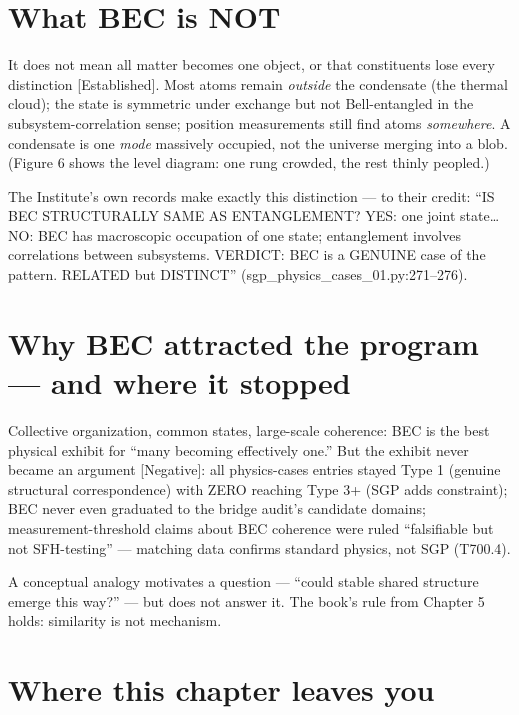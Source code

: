 \documentclass[
  11pt,
]{book}
\begin{document}
\section{What BEC is NOT}\label{what-bec-is-not}

It does not mean all matter becomes one object, or that constituents
lose every distinction {[}Established{]}. Most atoms remain
\emph{outside} the condensate (the thermal cloud); the state is
symmetric under exchange but not Bell-entangled in the
subsystem-correlation sense; position measurements still find atoms
\emph{somewhere}. A condensate is one \emph{mode} massively occupied,
not the universe merging into a blob. (Figure 6 shows the level diagram:
one rung crowded, the rest thinly peopled.)

The Institute's own records make exactly this distinction --- to their
credit: ``IS BEC STRUCTURALLY SAME AS ENTANGLEMENT? YES: one joint
state\ldots{} NO: BEC has macroscopic occupation of one state;
entanglement involves correlations between subsystems. VERDICT: BEC is a
GENUINE case of the pattern. RELATED but DISTINCT''
(sgp\_physics\_cases\_01.py:271--276).

\section{Why BEC attracted the program --- and where it
stopped}\label{why-bec-attracted-the-program-and-where-it-stopped}

Collective organization, common states, large-scale coherence: BEC is
the best physical exhibit for ``many becoming effectively one.'' But the
exhibit never became an argument {[}Negative{]}: all physics-cases
entries stayed Type 1 (genuine structural correspondence) with ZERO
reaching Type 3+ (SGP adds constraint); BEC never even graduated to the
bridge audit's candidate domains; measurement-threshold claims about BEC
coherence were ruled ``falsifiable but not SFH-testing'' --- matching
data confirms standard physics, not SGP (T700.4).

A conceptual analogy motivates a question --- ``could stable shared
structure emerge this way?'' --- but does not answer it. The book's rule
from Chapter 5 holds: similarity is not mechanism.

\section{Where this chapter leaves
you}\label{where-this-chapter-leaves-you-14}
\end{document}

